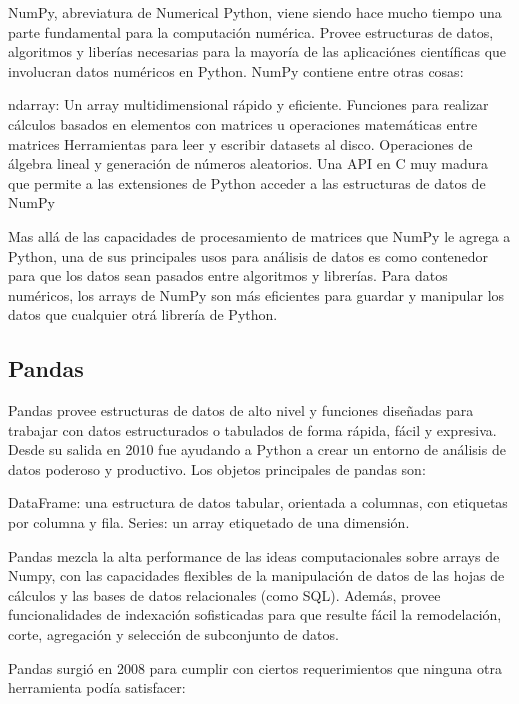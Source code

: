 NumPy, abreviatura de Numerical Python, viene siendo hace mucho tiempo una parte fundamental para la computación numérica. Provee estructuras de datos, algoritmos y liberías necesarias para la mayoría de las aplicaciónes científicas que involucran datos numéricos en Python. NumPy contiene entre otras cosas:
\begin{outline}
    \1 ndarray: Un array multidimensional rápido y eficiente.
    \1 Funciones para realizar cálculos basados en elementos con matrices u operaciones matemáticas entre matrices
    \1 Herramientas para leer y escribir datasets al disco.
    \1 Operaciones de álgebra lineal y generación de números aleatorios.
    \1 Una API en C muy madura que permite a las extensiones de Python acceder a las estructuras de datos de NumPy
\end{outline}
Mas allá de las capacidades de procesamiento de matrices que NumPy le agrega a Python, una de sus principales usos para análisis de datos es como contenedor para que los datos sean pasados entre algoritmos y librerías. Para datos numéricos, los arrays de NumPy son más eficientes para guardar y manipular los datos que cualquier otrá librería de Python.


\subsection[Pandas]{Pandas}

Pandas provee estructuras de datos de alto nivel y funciones diseñadas para trabajar con datos estructurados o tabulados de forma rápida, fácil y expresiva. Desde su salida en 2010 fue ayudando a Python a crear un entorno de análisis de datos poderoso y productivo. Los objetos principales de pandas son: 
\begin{outline}
    \1 DataFrame: una estructura de datos tabular, orientada a columnas, con etiquetas por columna y fila.
    \1 Series: un array etiquetado de una dimensión.
\end{outline}

Pandas mezcla la alta performance de las ideas computacionales sobre arrays de Numpy, con las capacidades flexibles de la manipulación de datos de las hojas de cálculos y las bases de datos relacionales (como SQL). Además, provee funcionalidades de indexación sofisticadas para que resulte fácil la remodelación, corte, agregación y selección de subconjunto de datos.

Pandas surgió en 2008 para cumplir con ciertos requerimientos que ninguna otra herramienta podía satisfacer:

